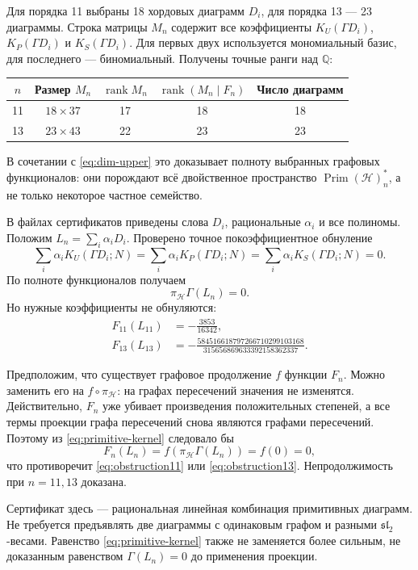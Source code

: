 \documentclass[11pt,a4paper]{article}
\numberwithin{equation}{section}
\theoremstyle{definition}
\theoremstyle{remark}
\newcommand{\sll}{\mathfrak{sl}}
\newcommand{\Q}{\mathbb Q}
\newcommand{\Prim}{\operatorname{Prim}}
\newcommand{\rk}{\operatorname{rank}}
\begin{document}
Для порядка 11 выбраны 18 хордовых диаграмм $D_i$, для порядка 13 ---
23 диаграммы. Строка матрицы $M_n$ содержит все коэффициенты
$K_U(\Gamma D_i)$, $K_P(\Gamma D_i)$ и $K_S(\Gamma D_i)$.
Для первых двух используется мономиальный базис, для последнего ---
биномиальный. Получены точные ранги над $\Q$:
\begin{center}
\begin{tabular}{ccccc}
\toprule
$n$&Размер $M_n$&$\rk M_n$&$\rk(M_n\mid F_n)$&Число диаграмм\\\midrule
11&$18\times37$&17&18&18\\
13&$23\times43$&22&23&23\\\bottomrule
\end{tabular}
\end{center}
В сочетании с \eqref{eq:dim-upper} это доказывает полноту выбранных
графовых функционалов: они порождают всё двойственное пространство
$\Prim(\mathcal H)_n^*$, а не только некоторое частное семейство.

В файлах сертификатов приведены слова $D_i$, рациональные
$\alpha_i$ и все полиномы. Положим $L_n=\sum_i\alpha_iD_i$.
Проверено точное покоэффициентное обнуление
\[
 \sum_i\alpha_i K_U(\Gamma D_i;N)=
 \sum_i\alpha_i K_P(\Gamma D_i;N)=
 \sum_i\alpha_i K_S(\Gamma D_i;N)=0.
\]
По полноте функционалов получаем
\begin{equation}\label{eq:primitive-kernel}
 \pi_{\mathcal H}\Gamma(L_n)=0.
\end{equation}
Но нужные коэффициенты не обнуляются:
\begin{align}
 F_{11}(L_{11})&=-\frac{3853}{16342},\label{eq:obstruction11}\\
 F_{13}(L_{13})&=-\frac{584516618797266710299103168}
 {315656869633392158362337}.\label{eq:obstruction13}
\end{align}

Предположим, что существует графовое продолжение $f$ функции $F_n$.
Можно заменить его на $f\circ\pi_{\mathcal H}$: на графах пересечений
значения не изменятся. Действительно, $F_n$ уже убивает произведения
положительных степеней, а все термы проекции графа пересечений снова
являются графами пересечений. Поэтому из \eqref{eq:primitive-kernel}
следовало бы
\[
 F_n(L_n)=f(\pi_{\mathcal H}\Gamma(L_n))=f(0)=0,
\]
что противоречит \eqref{eq:obstruction11} или
\eqref{eq:obstruction13}. Непродолжимость при $n=11,13$ доказана.

Сертификат здесь --- рациональная линейная комбинация примитивных
диаграмм. Не требуется предъявлять две диаграммы с одинаковым графом
и разными $\sll_2$-весами. Равенство \eqref{eq:primitive-kernel} также
не заменяется более сильным, не доказанным равенством
$\Gamma(L_n)=0$ до применения проекции.
\end{document}
